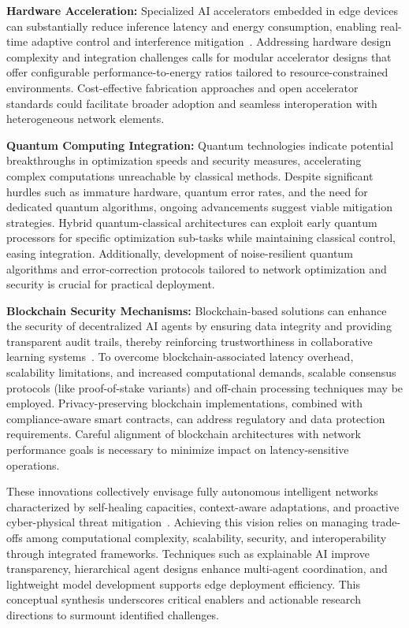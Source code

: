 \documentclass[sigconf]{acmart}
\begin{document}
\textbf{Hardware Acceleration:} Specialized AI accelerators embedded in edge devices can substantially reduce inference latency and energy consumption, enabling real-time adaptive control and interference mitigation~\cite{ref50}. Addressing hardware design complexity and integration challenges calls for modular accelerator designs that offer configurable performance-to-energy ratios tailored to resource-constrained environments. Cost-effective fabrication approaches and open accelerator standards could facilitate broader adoption and seamless interoperation with heterogeneous network elements.

\textbf{Quantum Computing Integration:} Quantum technologies indicate potential breakthroughs in optimization speeds and security measures, accelerating complex computations unreachable by classical methods. Despite significant hurdles such as immature hardware, quantum error rates, and the need for dedicated quantum algorithms, ongoing advancements suggest viable mitigation strategies. Hybrid quantum-classical architectures can exploit early quantum processors for specific optimization sub-tasks while maintaining classical control, easing integration. Additionally, development of noise-resilient quantum algorithms and error-correction protocols tailored to network optimization and security is crucial for practical deployment.

\textbf{Blockchain Security Mechanisms:} Blockchain-based solutions can enhance the security of decentralized AI agents by ensuring data integrity and providing transparent audit trails, thereby reinforcing trustworthiness in collaborative learning systems~\cite{ref54}. To overcome blockchain-associated latency overhead, scalability limitations, and increased computational demands, scalable consensus protocols (like proof-of-stake variants) and off-chain processing techniques may be employed. Privacy-preserving blockchain implementations, combined with compliance-aware smart contracts, can address regulatory and data protection requirements. Careful alignment of blockchain architectures with network performance goals is necessary to minimize impact on latency-sensitive operations.

These innovations collectively envisage fully autonomous intelligent networks characterized by self-healing capacities, context-aware adaptations, and proactive cyber-physical threat mitigation~\cite{ref55}. Achieving this vision relies on managing trade-offs among computational complexity, scalability, security, and interoperability through integrated frameworks. Techniques such as explainable AI improve transparency, hierarchical agent designs enhance multi-agent coordination, and lightweight model development supports edge deployment efficiency. This conceptual synthesis underscores critical enablers and actionable research directions to surmount identified challenges.
\end{document}
